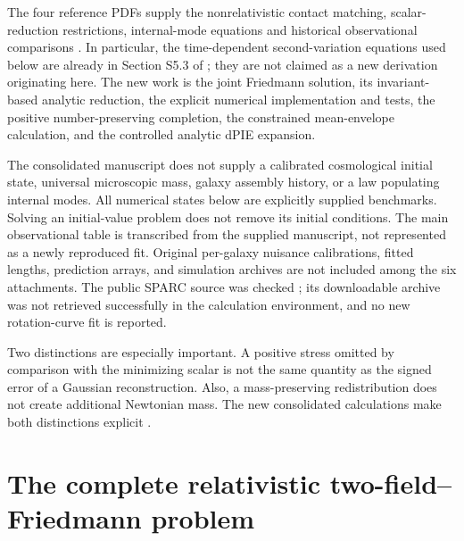 \documentclass[11pt]{article}
\begin{document}
The four reference PDFs supply the nonrelativistic contact matching, scalar-reduction restrictions, internal-mode equations and historical observational comparisons \cite{cubicmain,cubicsupp,channelmain,channelsupp}. In particular, the time-dependent second-variation equations used below are already in Section S5.3 of \cite{channelsupp}; they are not claimed as a new derivation originating here. The new work is the joint Friedmann solution, its invariant-based analytic reduction, the explicit numerical implementation and tests, the positive number-preserving completion, the constrained mean-envelope calculation, and the controlled analytic dPIE expansion.

The consolidated manuscript does not supply a calibrated cosmological initial state, universal microscopic mass, galaxy assembly history, or a law populating internal modes. All numerical states below are explicitly supplied benchmarks. Solving an initial-value problem does not remove its initial conditions. The main observational table is transcribed from the supplied manuscript, not represented as a newly reproduced fit. Original per-galaxy nuisance calibrations, fitted lengths, prediction arrays, and simulation archives are not included among the six attachments. The public SPARC source was checked \cite{sparc}; its downloadable archive was not retrieved successfully in the calculation environment, and no new rotation-curve fit is reported.

Two distinctions are especially important. A positive stress omitted by comparison with the minimizing scalar is not the same quantity as the signed error of a Gaussian reconstruction. Also, a mass-preserving redistribution does not create additional Newtonian mass. The new consolidated calculations make both distinctions explicit \cite[Sections 5--8, 14.7 and 31.4]{consolidated}.

\section{The complete relativistic two-field--Friedmann problem}
\end{document}
